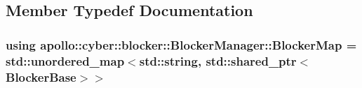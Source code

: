 \subsection{Member Typedef Documentation}
\hypertarget{classapollo_1_1cyber_1_1blocker_1_1BlockerManager_aab93de92687db46229801f733c741334}{
\subsubsection[{Blocker\-Map}]{\setlength{\rightskip}{0pt plus 5cm}using {\bf apollo\-::cyber\-::blocker\-::\-Blocker\-Manager\-::\-Blocker\-Map} =  std\-::unordered\-\_\-map$<$std\-::string, std\-::shared\-\_\-ptr$<${\bf Blocker\-Base}$>$$>$}}\label{classapollo_1_1cyber_1_1blocker_1_1BlockerManager_aab93de92687db46229801f733c741334}


